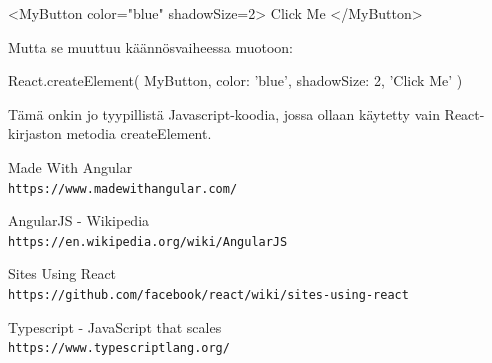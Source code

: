 \documentclass[a4paper,12pt,twoside]{article} %
\begin{document}
\vspace{4mm}\noindent
<MyButton color="blue" shadowSize={2}>
  Click Me
</MyButton>

\vspace{4mm}\noindent
Mutta se muuttuu käännösvaiheessa muotoon:

\vspace{4mm}\noindent
React.createElement(
  MyButton,
  {color: 'blue', shadowSize: 2},
  'Click Me'
)

\vspace{4mm}\noindent
Tämä onkin jo tyypillistä Javascript-koodia, jossa ollaan käytetty vain React-kirjaston metodia createElement.

\newpage
\setcounter{secnumdepth}{0}

\begin{thebibliography}{9}

Made With Angular
\\\texttt{https://www.madewithangular.com/}

AngularJS - Wikipedia
\\\texttt{https://en.wikipedia.org/wiki/AngularJS}

Sites Using React
\\\texttt{https://github.com/facebook/react/wiki/sites-using-react}

Typescript - JavaScript that scales
\\\texttt{https://www.typescriptlang.org/}

\end{thebibliography}
\end{document}

